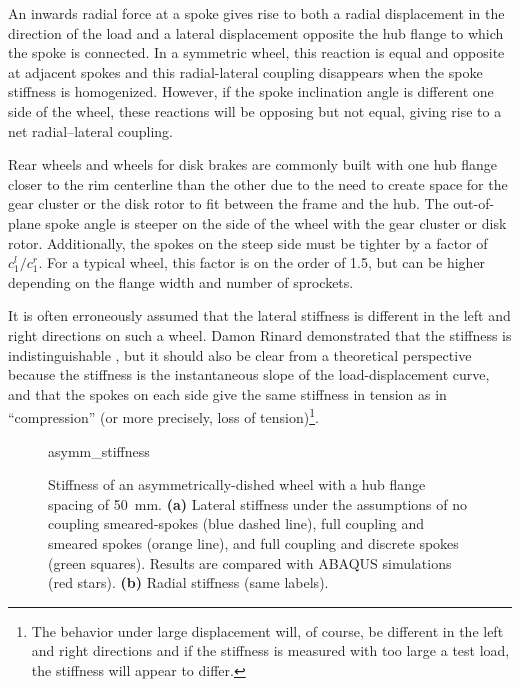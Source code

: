 \documentclass[\rootdir/thesis.tex]{subfiles}
\begin{document}
An inwards radial force at a spoke gives rise to both a radial displacement in the direction of the load and a lateral displacement opposite the hub flange to which the spoke is connected. In a symmetric wheel, this reaction is equal and opposite at adjacent spokes and this radial-lateral coupling disappears when the spoke stiffness is homogenized. However, if the spoke inclination angle is different one side of the wheel, these reactions will be opposing but not equal, giving rise to a net radial--lateral coupling.

Rear wheels and wheels for disk brakes are commonly built with one hub flange closer to the rim centerline than the other due to the need to create space for the gear cluster or the disk rotor to fit between the frame and the hub. The out-of-plane spoke angle is steeper on the side of the wheel with the gear cluster or disk rotor. Additionally, the spokes on the steep side must be tighter by a factor of $c_1^l/c_1^r$. For a typical wheel, this factor is on the order of 1.5, but can be higher depending on the flange width and number of sprockets.

It is often erroneously assumed that the lateral stiffness is different in the left and right directions on such a wheel. Damon Rinard demonstrated that the stiffness is indistinguishable \cite{Rinard}, but it should also be clear from a theoretical perspective because the stiffness is the instantaneous slope of the load-displacement curve, and that the spokes on each side give the same stiffness in tension as in ``compression'' (or more precisely, loss of tension)\footnote{The behavior under large displacement will, of course, be different in the left and right directions and if the stiffness is measured with too large a test load, the stiffness will appear to differ.}.

\begin{figure}[t]
\centering
{asymm_stiffness}
\caption{Stiffness of an asymmetrically-dished wheel with a hub flange spacing of \SI{50}{mm}. \textbf{(a)} Lateral stiffness under the assumptions of no coupling smeared-spokes (blue dashed line), full coupling and smeared spokes (orange line), and full coupling and discrete spokes (green squares). Results are compared with ABAQUS simulations (red stars). \textbf{(b)} Radial stiffness (same labels).}
\label{fig:asymm_wheel}
\end{figure}
\end{document}
